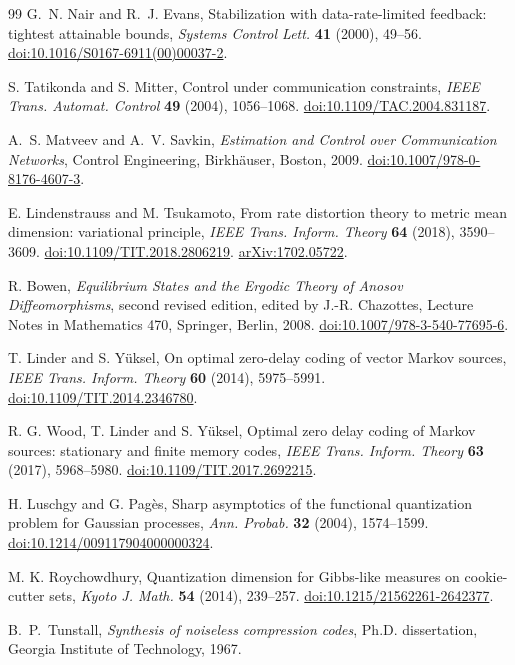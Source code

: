 \begin{thebibliography}{99}
G.~N. Nair and R.~J. Evans, Stabilization with data-rate-limited
feedback: tightest attainable bounds, \emph{Systems Control Lett.}
\textbf{41} (2000), 49--56.
\href{https://doi.org/10.1016/S0167-6911(00)00037-2}{doi:10.1016/S0167-6911(00)00037-2}.

S. Tatikonda and S. Mitter, Control under communication constraints,
\emph{IEEE Trans. Automat. Control} \textbf{49} (2004), 1056--1068.
\href{https://doi.org/10.1109/TAC.2004.831187}{doi:10.1109/TAC.2004.831187}.

A.~S. Matveev and A.~V. Savkin, \emph{Estimation and Control over
Communication Networks}, Control Engineering, Birkh\"auser, Boston, 2009.
\href{https://doi.org/10.1007/978-0-8176-4607-3}{doi:10.1007/978-0-8176-4607-3}.

E. Lindenstrauss and M. Tsukamoto, From rate distortion theory to
metric mean dimension: variational principle,
\emph{IEEE Trans. Inform. Theory} \textbf{64} (2018), 3590--3609.
\href{https://doi.org/10.1109/TIT.2018.2806219}{doi:10.1109/TIT.2018.2806219}.
\href{https://arxiv.org/abs/1702.05722}{arXiv:1702.05722}.

R. Bowen, \emph{Equilibrium States and the Ergodic Theory of Anosov
Diffeomorphisms}, second revised edition, edited by J.-R. Chazottes,
Lecture Notes in Mathematics 470, Springer, Berlin, 2008.
\href{https://doi.org/10.1007/978-3-540-77695-6}{doi:10.1007/978-3-540-77695-6}.

T. Linder and S. Y\"uksel, On optimal zero-delay coding of vector
Markov sources, \emph{IEEE Trans. Inform. Theory} \textbf{60}
(2014), 5975--5991.
\href{https://doi.org/10.1109/TIT.2014.2346780}{doi:10.1109/TIT.2014.2346780}.

R. G. Wood, T. Linder and S. Y\"uksel, Optimal zero delay coding of
Markov sources: stationary and finite memory codes,
\emph{IEEE Trans. Inform. Theory} \textbf{63} (2017), 5968--5980.
\href{https://doi.org/10.1109/TIT.2017.2692215}{doi:10.1109/TIT.2017.2692215}.

H. Luschgy and G. Pag\`es, Sharp asymptotics of the functional
quantization problem for Gaussian processes,
\emph{Ann. Probab.} \textbf{32} (2004), 1574--1599.
\href{https://doi.org/10.1214/009117904000000324}{doi:10.1214/009117904000000324}.

M. K. Roychowdhury, Quantization dimension for Gibbs-like measures
on cookie-cutter sets, \emph{Kyoto J. Math.} \textbf{54} (2014),
239--257.
\href{https://doi.org/10.1215/21562261-2642377}{doi:10.1215/21562261-2642377}.

B.~P.~Tunstall, \emph{Synthesis of noiseless compression codes},
Ph.D. dissertation, Georgia Institute of Technology, 1967.

\end{thebibliography}

